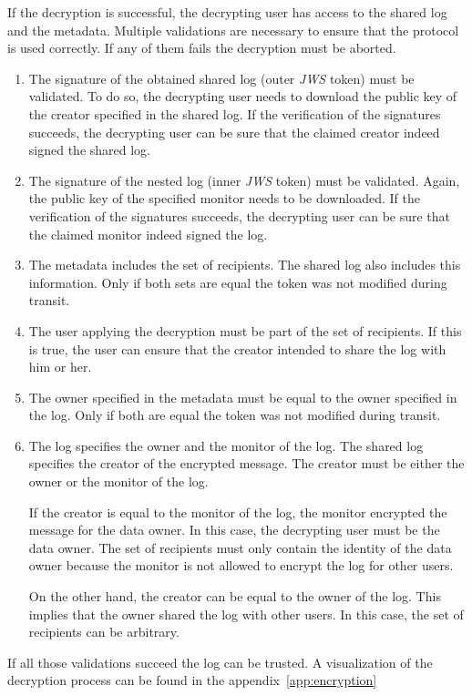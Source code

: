 \documentclass[../main.tex]{subfiles}
\begin{document}
If the decryption is successful, the decrypting user has access to the shared log and the metadata.
Multiple validations are necessary to ensure that the protocol is used correctly.
If any of them fails the decryption must be aborted.
\begin{enumerate}
    \item 
    The signature of the obtained shared log (outer \textit{JWS} token) must be validated.
    To do so, the decrypting user needs to download the public key of the creator specified in the shared log.
    If the verification of the signatures succeeds, the decrypting user can be sure that the claimed creator indeed signed the shared log.
    \item
    The signature of the nested log (inner \textit{JWS} token) must be validated.
    Again, the public key of the specified monitor needs to be downloaded.
    If the verification of the signatures succeeds, the decrypting user can be sure that the claimed monitor indeed signed the log.
    \item
    The metadata includes the set of recipients.
    The shared log also includes this information.
    Only if both sets are equal the token was not modified during transit.
    \item
    The user applying the decryption must be part of the set of recipients.
    If this is true, the user can ensure that the creator intended to share the log with him or her.
    \item
    The owner specified in the metadata must be equal to the owner specified in the log.
    Only if both are equal the token was not modified during transit.
    \item
    The log specifies the owner and the monitor of the log.
    The shared log specifies the creator of the encrypted message.
    The creator must be either the owner or the monitor of the log.
    
    If the creator is equal to the monitor of the log, the monitor encrypted the message for the data owner.
    In this case, the decrypting user must be the data owner.
    The set of recipients must only contain the identity of the data owner because the monitor is not allowed to encrypt the log for other users.

    On the other hand, the creator can be equal to the owner of the log.
    This implies that the owner shared the log with other users.
    In this case, the set of recipients can be arbitrary.
\end{enumerate}
If all those validations succeed the log can be trusted.
A visualization of the decryption process can be found in the appendix~\ref{app:encryption}
\end{document}
